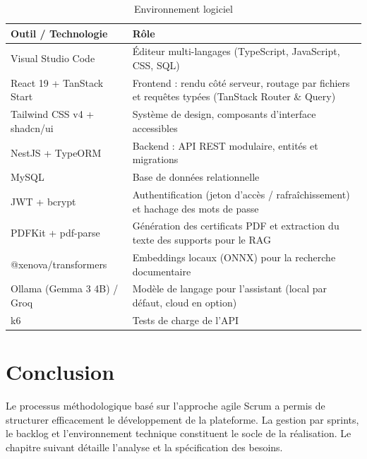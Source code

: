 \documentclass[12pt,a4paper,oneside,openany]{report}
\begin{document}
\begin{table}[H]
\centering
\begin{tabular}{|p{4.4cm}|p{8.6cm}|}
\hline
\textbf{Outil / Technologie} & \textbf{Rôle} \\
\hline
Visual Studio Code & Éditeur multi-langages (TypeScript, JavaScript, CSS, SQL) \\
\hline
React 19 + TanStack Start & Frontend : rendu côté serveur, routage par fichiers et requêtes typées (TanStack Router \& Query) \\
\hline
Tailwind CSS v4 + shadcn/ui & Système de design, composants d'interface accessibles \\
\hline
NestJS + TypeORM & Backend : API REST modulaire, entités et migrations \\
\hline
MySQL & Base de données relationnelle \\
\hline
JWT + bcrypt & Authentification (jeton d'accès / rafraîchissement) et hachage des mots de passe \\
\hline
PDFKit + pdf-parse & Génération des certificats PDF et extraction du texte des supports pour le RAG \\
\hline
@xenova/transformers & Embeddings locaux (ONNX) pour la recherche documentaire \\
\hline
Ollama (Gemma 3 4B) / Groq & Modèle de langage pour l'assistant (local par défaut, cloud en option) \\
\hline
k6 & Tests de charge de l'API \\
\hline
\end{tabular}
\caption{Environnement logiciel}
\end{table}

\section*{Conclusion}
\hrulefill

Le processus méthodologique basé sur l'approche agile Scrum a permis de structurer efficacement le développement de la plateforme. La gestion par sprints, le backlog et l'environnement technique constituent le socle de la réalisation. Le chapitre suivant détaille l'analyse et la spécification des besoins.

\end{document}
